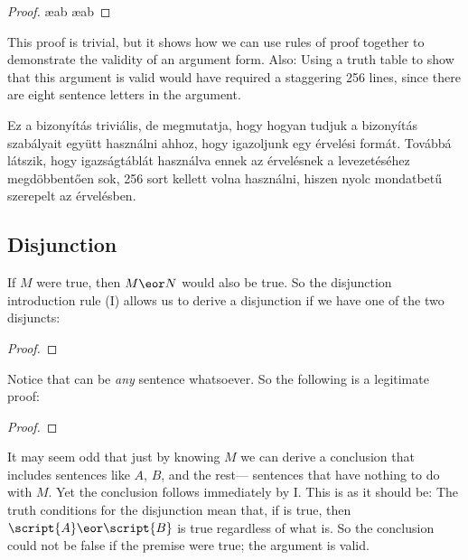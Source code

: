 \begin{proof}

	 \ae{ab}
	 \ae{ab}
	 
\end{proof}

This proof is trivial, but it shows how we can use rules of proof together to demonstrate the validity of an argument form. Also: Using a truth table to show that this argument is valid would have required a staggering 256 lines, since there are eight sentence letters in the argument.

Ez a bizonyítás triviális, de megmutatja, hogy hogyan tudjuk a bizonyítás szabályait együtt használni ahhoz, hogy igazoljunk egy érvelési formát. Továbbá látszik, hogy igazságtáblát használva  ennek az érvelésnek a levezetéséhez megdöbbentően sok, 256 sort kellett volna használni, hiszen nyolc mondatbetű szerepelt az érvelésben.




\subsection{Disjunction}
If $M$ were true, then $M \eor N$ would also be true. So the disjunction introduction rule ({\eor}I) allows us to derive a disjunction if we have one of the two disjuncts:

\begin{proof}
\end{proof}

Notice that  can be \emph{any} sentence whatsoever. So the following is a legitimate proof:

\begin{proof}
\end{proof}

It may seem odd that just by knowing $M$ we can derive a conclusion that includes sentences like $A$, $B$, and the rest--- sentences that have nothing to do with $M$. Yet the conclusion follows immediately by {\eor}I. This is as it should be: The truth conditions for the disjunction mean that, if  is true, then $\script{A}\eor \script{B}$ is true regardless of what  is. So the conclusion could not be false if the premise were true; the argument is valid.

